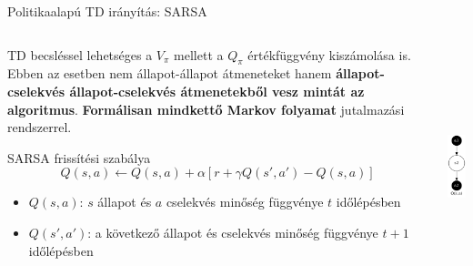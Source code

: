\documentclass[english, aspectratio=169]{beamer}
\begin{document}
\begin{frame}{Politikaalapú TD irányítás: SARSA}
\begin{columns}
\begin{column}{.8\textwidth}
TD becsléssel lehetséges a $V_\pi$ mellett a $Q_\pi$ értékfüggvény kiszámolása is. Ebben az esetben nem állapot-állapot átmeneteket hanem \textbf{állapot-cselekvés állapot-cselekvés átmenetekből vesz mintát az algoritmus}. \textbf{Formálisan mindkettő Markov folyamat} jutalmazási rendszerrel. \par\smallskip
\begin{center}
\begin{block}{SARSA frissítési szabálya}
\[
Q(s,a) \leftarrow Q(s,a) + \alpha \left[ r + \gamma Q(s',a') - Q(s,a) \right]
\]
\vspace{-0.5cm}
\begin{itemize}
	\item $Q(s,a)$: $s$ állapot és $a$ cselekvés minőség függvénye $t$ időlépésben
	\item $Q(s',a')$: a következő állapot és cselekvés minőség függvénye $t+1$ időlépésben
\end{itemize}
\end{block}
\end{center}
\end{column}
\begin{column}{.2\textwidth}
\begin{center}
\includegraphics[height=7cm, keepaspectratio]{graphs/mc_td_5.png}
\end{center}
\end{column}
\end{columns}
\end{frame}
\end{document}
